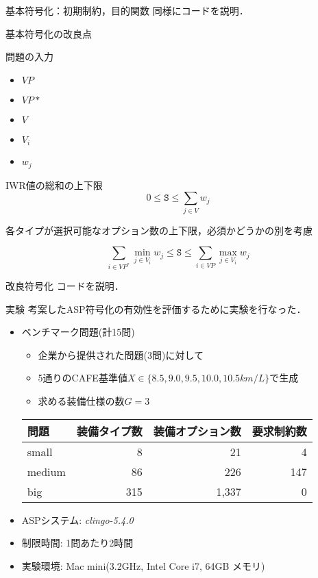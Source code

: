 \documentclass[dvipdfmx, 11pt]{beamer}
\begin{document}
\begin{frame}{基本符号化：初期制約，目的関数}
 同様にコードを説明．
\end{frame}
\begin{frame}{基本符号化の改良点}
 \begin{block}{問題の入力}
  \begin{itemize}
   \item $VP$ 
   \item $VP*$
   \item $V$
   \item $V_i$
   \item $w_j$
  \end{itemize}
 \end{block}
 \begin{block}{IWR値の総和の上下限}
  \[
   0 \leq \texttt{S} \leq \sum_{j\in V}w_{j}
  \]
 \end{block}
 \alert{各タイプが選択可能なオプション数の上下限，必須かどうかの別を考慮}
 \begin{alertblock}{}
  \[
   \sum_{i\in VP^{*}}\min_{j\in V_{i}}w_{j}
   \leq \texttt{S} \leq
   \sum_{i\in VP}\max_{j\in V_{i}}w_{j}
  \]
 \end{alertblock}
\end{frame}
\begin{frame}{改良符号化}
 コードを説明．
\end{frame}
\begin{frame}{実験}
 考案したASP符号化の有効性を評価するために実験を行なった．
 \begin{itemize}
  \item ベンチマーク問題(計15問)
	\begin{itemize}
	 \item 企業から提供された問題(3問)に対して
	 \item 5通りのCAFE基準値$X \in \{8.5, 9.0, 9.5, 10.0, 10.5km/L\}$で生成
	 \item 求める装備仕様の数$G = 3$
	\end{itemize}
	\begin{exampleblock}\small
	 \centering
	 \begin{tabular}{ l|r r r }
	  問題		& 装備タイプ数	& 装備オプション数& 要求制約数 	\\ \hline
	  small	        & 8     	& 21		& 4		\\
	  medium	& 86		& 226		& 147	\\
	  big		& 315		& 1,337		& 0		\\
	 \end{tabular}
	\end{exampleblock}
  \item ASPシステム: \textit{clingo-5.4.0}
  \item 制限時間: 1問あたり2時間
  \item 実験環境: Mac mini(3.2GHz, Intel Core i7, 64GB メモリ)
 \end{itemize}
\end{frame}
\end{document}
